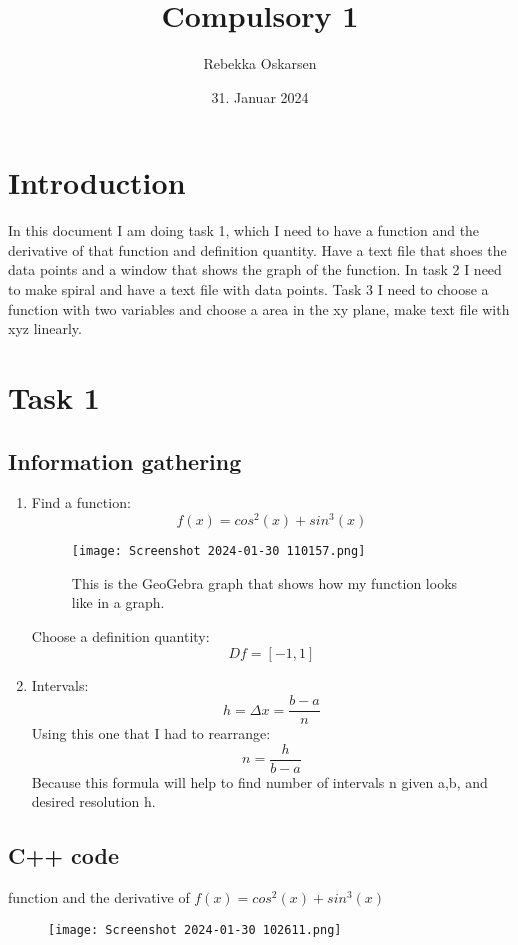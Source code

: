 \documentclass[12pt]{article}
\title{Compulsory 1}
\author{Rebekka Oskarsen}
\date{31. Januar 2024}
\begin{document}
\maketitle
\tableofcontents
\newpage

\section{Introduction}
In this document I am doing task 1, which I need to have a function and the derivative of that function and definition quantity. Have a text file that shoes the data points and a window that shows the graph of the function.
In task 2 I need to make spiral and have a text file with data points.
Task 3 I need to choose a function with two variables and choose a area in the xy plane, make text file with xyz linearly.

\section{Task 1}
\subsection{Information gathering}
\begin{enumerate}
  \item Find a function:\[ f(x)=cos^2(x)+sin^3(x) \]
  \begin{figure}[htp]
\centering
\texttt{[image: Screenshot 2024-01-30 110157.png]}
\caption{\label{fig:Graph}This is the GeoGebra graph that shows how my function looks like in a graph.}
\end{figure}

Choose a definition quantity: \[ Df = [-1, 1] \]

    \item Intervals: \[ h = \Delta x = \frac{b-a}{n} \] 
Using this one that I had to rearrange:
\[n= \frac{h}{b-a}\]
Because this formula will help to find number of intervals n given a,b, and desired resolution h.
\end{enumerate}
  \newpage
  \subsection{C++ code}
 function and the derivative of \( f(x)=cos^2(x)+sin^3(x) \)
\begin{figure}[htp]
\centering
\texttt{[image: Screenshot 2024-01-30 102611.png]}
\caption{\label{fig:c++code} }
\end{figure}
\end{document}
